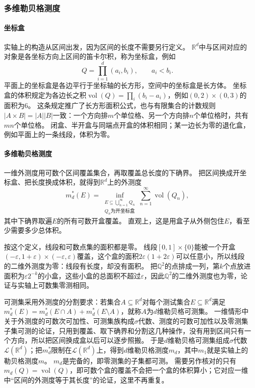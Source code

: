 \subsubsection{多维勒贝格测度}

\paragraph{坐标盒}

实轴上的构造从区间出发，因为区间的长度不需要另行定义。
$\mathbb R^d$中与区间对应的对象是各坐标方向上区间的笛卡尔积，称为坐标盒，例如
\[
 Q=\prod_{i=1}^d(a_i,b_i),\qquad a_i<b_i.
\]
平面上的坐标盒是各边平行于坐标轴的长方形，空间中的坐标盒是长方体。
坐标盒的体积规定为各边长之积$\operatorname{vol}(Q)=\prod_i(b_i-a_i)$，例如$(0,2)\times(0,3)$的面积为$6$。
这条规定推广了长方形面积公式，也与有限集合的计数规则$|A\times B|=|A||B|$一致：一个方向排$m$个单位格、另一个方向排$n$个单位格时，共有$mn$个单位格。
闭盒、半开盒与同端点开盒的体积相同；某一边长为零的退化盒，例如平面上的一条线段，体积为零。

\paragraph{多维勒贝格测度}

一维外测度用可数个区间覆盖集合，再取覆盖总长度的下确界。
把区间换成开坐标盒、把长度换成体积，就得到$\mathbb R^d$上的外测度
\[
 m_d^*(E)=\inf_{\substack{E\subseteq\bigcup_{n=1}^{\infty}Q_n\\
 Q_n\text{为开坐标盒}}}\sum_{n=1}^{\infty}\operatorname{vol}(Q_n),
\]
其中下确界取遍$E$的所有可数开盒覆盖。
直观上，这是用盒子从外侧包住$E$，看至少需要多少总体积。

按这个定义，线段和可数点集的面积都是零。
线段$[0,1]\times\{0\}$能被一个开盒$(-\varepsilon,1+\varepsilon)\times(-\varepsilon,\varepsilon)$覆盖，这个盒的面积$2\varepsilon(1+2\varepsilon)$可以任意小，所以线段的二维外测度为零：线段有长度，却没有面积。
把$\mathbb Q^2$的点排成一列，第$k$个点放进面积为$\varepsilon2^{-k}$的小盒，这些小盒的总面积不超过$\varepsilon$，因此$\mathbb Q^2$的二维外测度也为零，论证与实轴上可数集零测相同。

可测集采用外测度的分割要求：若集合$A\subseteq\mathbb R^d$对每个测试集合$E\subseteq\mathbb R^d$满足
$m_d^*(E)=m_d^*(E\cap A)+m_d^*(E\setminus A)$，就称$A$为$d$维勒贝格可测集。
一维情形中关于外测度的可数次可加性、可测集族构成$\sigma$代数、测度的可数可加性以及零测集子集可测的论证，只用到覆盖、取下确界和分割这几种操作，没有用到区间只有一个方向，所以把区间换成盒以后可以逐步照搬。
于是$d$维勒贝格可测集组成$\sigma$代数$\mathcal L(\mathbb R^d)$；把$m_d^*$限制在$\mathcal L(\mathbb R^d)$上，得到$d$维勒贝格测度$m_d$，其中$m_1$就是实轴上的勒贝格测度$m$。
$m_d$是完备的，即零测集的子集都可测。
需要另作核对的只有$m_d(Q)=\operatorname{vol}(Q)$，即可数个盒的覆盖不会把一个盒的体积算小；它对应一维中“区间的外测度等于其长度”的论证，这里不再重复。


